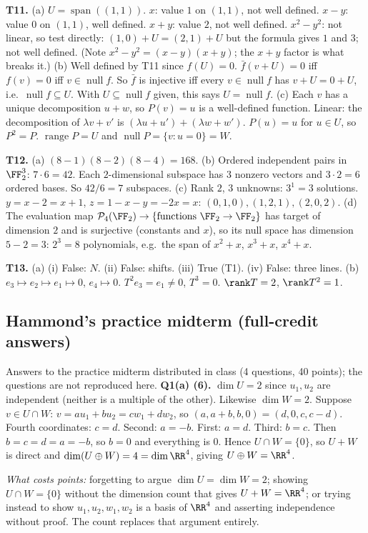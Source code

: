 \documentclass[11pt]{scrartcl}
\DeclareMathOperator{\nul}{null}
\DeclareMathOperator{\range}{range}
\DeclareMathOperator{\spn}{span}
\newcommand{\PP}{\mathcal P}
\begin{document}
\textbf{T11.}
(a) $U=\spn((1,1))$. $x$: value $1$ on $(1,1)$, not well defined. $x-y$: value $0$ on $(1,1)$, well defined. $x+y$: value $2$, not well defined. $x^2-y^2$: not linear, so test directly: $(1,0)+U=(2,1)+U$ but the formula gives $1$ and $3$; not well defined. (Note $x^2-y^2=(x-y)(x+y)$; the $x+y$ factor is what breaks it.)
(b) Well defined by T11 since $f(U)=0$. $\bar f(v+U)=0$ iff $f(v)=0$ iff $v\in\nul f$. So $\bar f$ is injective iff every $v\in\nul f$ has $v+U=0+U$, i.e.\ $\nul f\subseteq U$. With $U\subseteq\nul f$ given, this says $U=\nul f$.
(c) Each $v$ has a unique decomposition $u+w$, so $P(v)=u$ is a well-defined function. Linear: the decomposition of $\lambda v+v'$ is $(\lambda u+u')+(\lambda w+w')$. $P(u)=u$ for $u\in U$, so $P^2=P$. $\range P=U$ and $\nul P=\{v:u=0\}=W$.

\textbf{T12.}
(a) $(8-1)(8-2)(8-4)=168$.
(b) Ordered independent pairs in $\FF_2^3$: $7\cdot6=42$. Each $2$-dimensional subspace has $3$ nonzero vectors and $3\cdot2=6$ ordered bases. So $42/6=7$ subspaces.
(c) Rank $2$, $3$ unknowns: $3^{1}=3$ solutions. $y=x-2=x+1$, $z=1-x-y=-2x=x$: $(0,1,0),(1,2,1),(2,0,2)$.
(d) The evaluation map $\PP_4(\FF_2)\to\{\text{functions }\FF_2\to\FF_2\}$ has target of dimension $2$ and is surjective (constants and $x$), so its null space has dimension $5-2=3$: $2^3=8$ polynomials, e.g.\ the span of $x^2+x$, $x^3+x$, $x^4+x$.

\textbf{T13.}
(a) (i) False: $N$. (ii) False: shifts. (iii) True (T1). (iv) False: three lines.
(b) $e_3\mapsto e_2\mapsto e_1\mapsto0$, $e_4\mapsto0$. $T^2e_3=e_1\ne0$, $T^3=0$. $\rank T=2$, $\rank T^2=1$.

\subsection*{Hammond's practice midterm (full-credit answers)}
Answers to the practice midterm distributed in class (4 questions, 40 points); the questions are not reproduced here.
\medskip\noindent\textbf{Q1(a) (6).}
$\dim U=2$ since $u_1,u_2$ are independent (neither is a multiple of the other). Likewise $\dim W=2$.
Suppose $v\in U\cap W$: $v=a u_1+b u_2=c w_1+d w_2$, so $(a,a+b,b,0)=(d,0,c,c-d)$.
Fourth coordinates: $c=d$. Second: $a=-b$. First: $a=d$. Third: $b=c$. Then $b=c=d=a=-b$, so $b=0$ and everything is $0$. Hence $U\cap W=\{0\}$, so $U+W$ is direct and $\dim(U\oplus W)=4=\dim\RR^4$, giving $U\oplus W=\RR^4$.

\noindent\textit{What costs points:} forgetting to argue $\dim U=\dim W=2$; showing $U\cap W=\{0\}$ without the dimension count that gives $U+W=\RR^4$; or trying instead to show $u_1,u_2,w_1,w_2$ is a basis of $\RR^4$ and asserting independence without proof. The count replaces that argument entirely.
\end{document}

